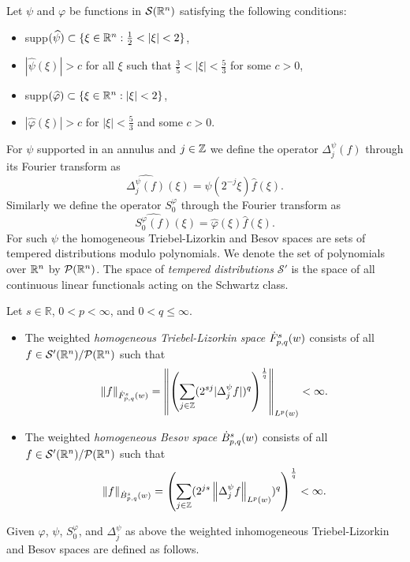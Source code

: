 Let $\psi$ and $\varphi$ be functions in $\sw$ satisfying the following conditions:
\begin{itemize}
\item supp$(\widehat{\psi})\subset\{\xi\in\rn : \frac{1}{2} < |\xi| <2\}$,
\item $|\widehat{\psi}(\xi)|>c$ for all $\xi$ such that $\frac{3}{5} < |\xi| < \frac{5}{3}$ for some $c>0$,
\item supp$(\widehat{\varphi}) \subset \{\xi\in\rn : |\xi| < 2\}$,
\item $|\widehat{\varphi}(\xi)|>c$ for $|\xi| < \frac{5}{3}$ and some $c>0$. 
\end{itemize}
For $\psi$ supported in an annulus and $j\in\ent$ we define the operator $\Delta^\psi_j(f)$ through its Fourier transform as \[\widehat{\Delta^\psi_j (f)}(\xi) = \psi(2^{-j}\xi)\widehat{f}(\xi).\]
Similarly we define the operator $S^\varphi_0$ through the Fourier transform as
\[ \widehat{S^\varphi_0 (f)}(\xi) = \widehat{\varphi}(\xi)\widehat{f}(\xi).\]
For such $\psi$ the homogeneous Triebel-Lizorkin and Besov spaces are sets of tempered distributions modulo polynomials. We denote the set of polynomials over $\rn$ by $\mathcal{P}(\rn)$. The space of \textit{tempered distributions} $\mathcal{S}'$ is the space of all continuous linear functionals acting on the Schwartz class.

\begin{dfn}\label{TL_B_def}
Let $s\in\mathbb{R}$, $0<p<\infty$, and $0<q\leq\infty$.
\begin{itemize}
\item The weighted \textit{homogeneous Triebel-Lizorkin space} $\tlw{p}{s}{q}{w}$ consists of all $f\in \swp/\mathcal{P}(\rn)$ such that 
\begin{equation*}
\norm{f}{\tlw{p}{s}{q}{w}}=\norm{\left(\sum_{j\in\ent}(2^{sj}|\Delta^\psi_jf|)^q\right)^{\frac{1}{q}}}{\lebw{p}{w}}<\infty.
\end{equation*}
\item The weighted \textit{homogeneous Besov space} $\besw{p}{s}{q}{w}$ consists of all $f\in \swp/\mathcal{P}(\rn)$ such that 
\begin{equation}
\norm{f}{\besw{p}{s}{q}{w}} = \left(\sum_{j\in\ent} (2^{js}\norm{\Delta^\psi_jf}{L^p(w)})^q\right)^{\frac{1}{q}} < \infty.
\end{equation}
\end{itemize}
\end{dfn}

Given $\varphi$, $\psi$, $S^\varphi_0$, and $\Delta^\psi_j$ as above the weighted inhomogeneous Triebel-Lizorkin and Besov spaces are defined as follows. 

